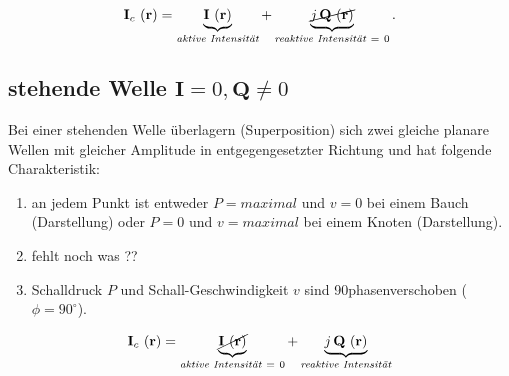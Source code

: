 \begin{equation}
	\mathbf{I}_c ~(\mathbf{r}) = \underbrace{\mathbf{I}~(\mathbf{r})}_{\textit{aktive Intensität}} + \underbrace{ \cancel{j\,\mathbf{Q}~(\mathbf{r})}}_{\textit{reaktive~Intensität}~=~0}.
	\label{helmholtz:equationIntensitaetComplexplanar}
\end{equation}	


\subsection{stehende Welle $\mathbf{I} = 0,\mathbf{Q} \neq 0$
\label{helmholtz:subsection:stehendeWelle}}

Bei einer stehenden Welle überlagern (Superposition) sich zwei gleiche planare Wellen mit gleicher Amplitude in entgegengesetzter Richtung und hat folgende Charakteristik:

\begin{enumerate}
\item an jedem Punkt ist entweder  $P = maximal$ und $v = 0$ bei einem Bauch (Darstellung) oder $P = 0$  und $ v = maximal$ bei einem Knoten (Darstellung).
\item fehlt noch was ??
\item Schalldruck $P$ und Schall-Geschwindigkeit $v$ sind 90\textdegree phasenverschoben ($\phi = 90^{\circ}$).
\end{enumerate}



\begin{equation}
	\mathbf{I}_c ~(\mathbf{r}) = \underbrace{\cancel{\mathbf{I}~(\mathbf{r})}}_{\textit{aktive Intensität}~=~0} + \underbrace{j\,\mathbf{Q}~(\mathbf{r})}_{\textit{reaktive~Intensität}}
	\label{helmholtz:equationIntensitaetComplexStehend}
\end{equation}	

